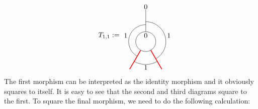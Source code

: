 \begin{equation}
\begin{tikzpicture}[scale=1,baseline=(current bounding box.center)]
		\end{tikzpicture}
		\hspace{5mm}
		T_{1,1}:=
		\begin{tikzpicture}[scale=1,baseline=(current bounding box.center)]
		\draw (0,0) circle (0.5cm);
		\draw[red,line width=0.4mm]
		\foreach \a in {-60, -120} {
			(\a:0.5) -- (\a:1.6)
		};
		\draw ([shift=(-60:1cm)]0,0) arc (-60:90:1cm);
		\draw ([shift=(-120:1.15cm)]0,0) arc (-120:-60:1.15cm);
		\draw ([shift=(240:0.85cm)]0,0) arc (240:90:0.85cm);
		\draw[] (90:0.5) -- (90:1.6);
		\node at (90:.3cm){$0$};\node at (90:1.75cm){$0$};
		\node at (-1,0.3) {$1$};
		\node at (1.15,0.3) {$1$};
		\node at (0,-1.3) {$1$};
		\end{tikzpicture}
	\end{equation}
\noindent
The first morphism can be interpreted as the identity morphism and it obviously squares to itself. It is easy to see that the second and third diagrams square to the first. To square the final morphism, we need to do the following calculation:\vspace{5pt}
